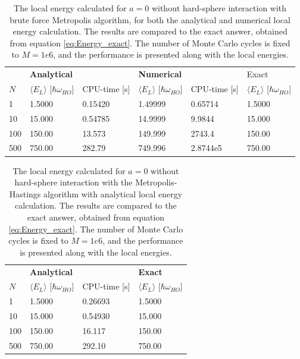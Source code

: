 \documentclass[norsk,a4paper,12pt]{article}
\begin{document}
\begin{table} [H]
	\centering
	\caption{The local energy calculated for $a=0$  without hard-sphere interaction with brute force Metropolis algorithm, for both the analytical and numerical local energy calculation. The results are compared to the exact answer, obtained from equation \ref{eq:Energy_exact}. The number of Monte Carlo cycles is fixed to $M=1e6$, and the performance is presented along with the local energies. }
	\begin{tabularx}{\textwidth}{X|XX|XX|X} \hline
		\label{tab:BFmet}
		& \multicolumn{2}{X}{\textbf{Analytical}} & \multicolumn{2}{X}{\textbf{Numerical}} & Exact \\
		$N$ & $\langle E_L\rangle$ [$\hbar\omega_{HO}$] & CPU-time [s] & $\langle E_L\rangle$ [$\hbar\omega_{HO}$] & CPU-time [s]& $\langle E_L\rangle$ [$\hbar\omega_{HO}$]\\ \hline
		1 & 1.5000 & 0.15420 & 1.49999 & 0.65714 & 1.5000\\
		10 & 15.000 & 0.54785 & 14.9999 & 9.9844 & 15.000\\
		100 & 150.00 & 13.573 & 149.999 & 2743.4 & 150.00\\
		500 & 750.00 & 282.79 & 749.996 & 2.8744e5 & 750.00\\ \hline
	\end{tabularx}
\end{table}

\begin{table} [H]
	\centering
	\caption{The local energy calculated for $a=0$  without hard-sphere interaction with the Metropolis-Hastings algorithm with analytical local energy calculation. The results are compared to the exact answer, obtained from equation \ref{eq:Energy_exact}. The number of Monte Carlo cycles is fixed to $M=1e6$, and the performance is presented along with the local energies.}
	\begin{tabularx}{\textwidth}{X|XX|X} \hline
		\label{tab:ISmet}
		& \textbf{Analytical}  & & \textbf{Exact}\\
		$N$ & $\langle E_L\rangle$ [$\hbar\omega_{HO}$] & CPU-time [s] & $\langle E_L\rangle$ [$\hbar\omega_{HO}$]\\ \hline
		1 & 1.5000 & 0.26693  & 1.5000 \\
		10 & 15.000 &  0.54930 & 15.000 \\
		100 & 150.00 & 16.117 & 150.00 \\
		500 & 750.00 & 292.10 & 750.00 \\ \hline
	\end{tabularx}
\end{table}
\end{document}
